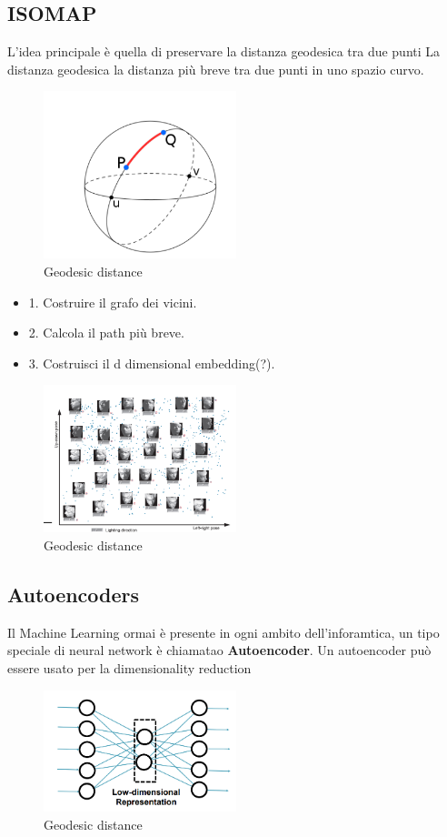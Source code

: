 \subsection{ISOMAP}
L'idea principale è quella di preservare la distanza geodesica tra due punti
La distanza geodesica la distanza più breve tra due punti in uno spazio curvo.
\begin{figure}[H]
    \centering
    \includegraphics[width=0.5\textwidth]{images/geod.png} 
    \caption{Geodesic distance}
    \label{fig:immagine}
\end{figure}
\begin{itemize}
    \item 1. Costruire il grafo dei vicini.
    \item 2. Calcola il path più breve.
    \item 3. Costruisci il d dimensional embedding(?).
\end{itemize}
\begin{figure}[H]
    \centering
    \includegraphics[width=0.5\textwidth]{images/ISOMAP.png} 
    \caption{Geodesic distance}
    \label{fig:immagine}
\end{figure}
\subsection{Autoencoders}
Il Machine Learning ormai è presente in ogni ambito dell'inforamtica, un tipo speciale di neural network è chiamatao \textbf{Autoencoder}.
Un autoencoder può essere usato per la dimensionality reduction
\begin{figure}[H]
    \centering
    \includegraphics[width=0.5\textwidth]{images/Autoencoders.png} 
    \caption{Geodesic distance}
    \label{fig:immagine}
\end{figure}
